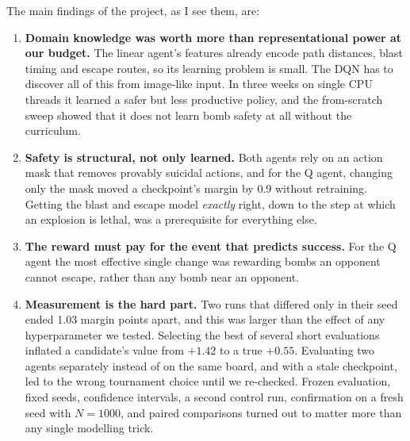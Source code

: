 \documentclass[11pt]{article}
\begin{document}
The main findings of the project, as I see them, are:
\begin{enumerate}
  \item \textbf{Domain knowledge was worth more than representational power at our budget.} The linear agent's features already encode path distances, blast timing and escape routes, so its learning problem is small. The DQN has to discover all of this from image-like input. In three weeks on single CPU threads it learned a safer but less productive policy, and the from-scratch sweep showed that it does not learn bomb safety at all without the curriculum.
  \item \textbf{Safety is structural, not only learned.} Both agents rely on an action mask that removes provably suicidal actions, and for the Q agent, changing only the mask moved a checkpoint's margin by 0.9 without retraining. Getting the blast and escape model \emph{exactly} right, down to the step at which an explosion is lethal, was a prerequisite for everything else.
  \item \textbf{The reward must pay for the event that predicts success.} For the Q agent the most effective single change was rewarding bombs an opponent cannot escape, rather than any bomb near an opponent.
  \item \textbf{Measurement is the hard part.} Two runs that differed only in their seed ended 1.03 margin points apart, and this was larger than the effect of any hyperparameter we tested. Selecting the best of several short evaluations inflated a candidate's value from $+1.42$ to a true $+0.55$. Evaluating two agents separately instead of on the same board, and with a stale checkpoint, led to the wrong tournament choice until we re-checked. Frozen evaluation, fixed seeds, confidence intervals, a second control run, confirmation on a fresh seed with $N = 1000$, and paired comparisons turned out to matter more than any single modelling trick.
\end{enumerate}
\end{document}
